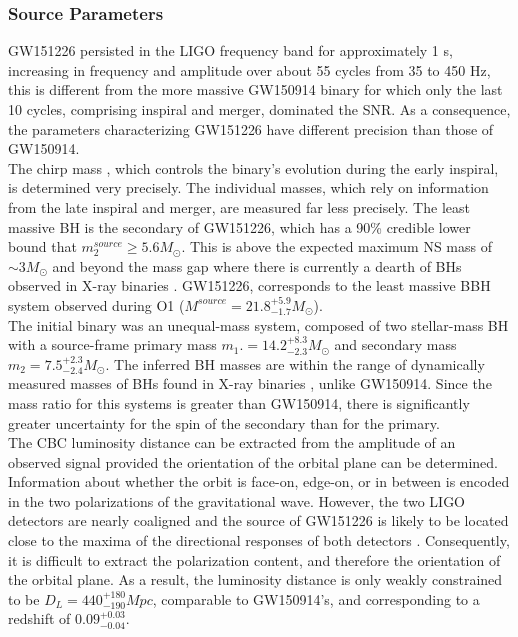 \documentclass[binding=0.6cm, LaM]{sapthesis}
\begin{document}
	\subsubsection{Source Parameters}
	GW151226 persisted in the LIGO frequency band for approximately 1 s, 
	increasing in frequency and amplitude over about 55 cycles from 35 to 450 Hz, 
	this is different from the more massive GW150914 binary for which only the last 10 cycles, 
	comprising inspiral and merger, dominated the SNR. 
	As a consequence, the parameters characterizing GW151226 have different precision than those of GW150914. \\
	The chirp mass  \cite{126, 127}, which controls the binary’s evolution during the early inspiral, is determined very precisely. 
	The individual masses, which rely on information from the late inspiral and merger, are measured far less precisely. 
	The least massive BH is the secondary of GW151226, which has a 90\% credible lower bound that $m^{source}_2 \geq 5.6M_\odot$.
	This is above the expected maximum NS mass of $\sim3M_\odot$ \cite{121, 122} 
	and beyond the mass gap where there is currently a dearth of BHs observed in X-ray binaries \cite{123, 125}. 
	GW151226, corresponds to the least massive BBH system observed during O1 ($M^{source} = 21.8^{+5.9}_{-1.7}M_\odot$). \\
	The initial binary was an unequal-mass system, composed of two stellar-mass BH 
	with a source-frame primary mass $m_1. = 14.2^{+8.3}_{-2.3}M_\odot$ and secondary mass $m_2 = 7.5^{+2.3}_{-2.4}M_\odot$.
	The inferred BH masses are within the range of dynamically measured masses of BHs found in X-ray binaries \cite{128-132}, unlike GW150914. 
	Since the mass ratio for this systems is greater than GW150914,
	there is significantly greater uncertainty for the spin of the secondary than for the primary. \\
	The CBC luminosity distance can be extracted from the amplitude of an observed signal provided the orientation of the orbital plane can be determined. 
	Information about whether the orbit is face-on, edge-on, or in between is encoded in the two polarizations of the gravitational wave. 
	However, the two LIGO detectors are nearly coaligned and the source of GW151226 is likely to be located close to the maxima of the directional responses of both detectors \cite{28}. 
	Consequently, it is difficult to extract the polarization content, and therefore the orientation of the orbital plane. 
	As a result, the luminosity distance is only weakly constrained to be $D_L = 440^{+180}_{-190}Mpc$, comparable to GW150914’s, and corresponding to a redshift of $0.09^{+0.03}_{-0.04}$.
\end{document}
